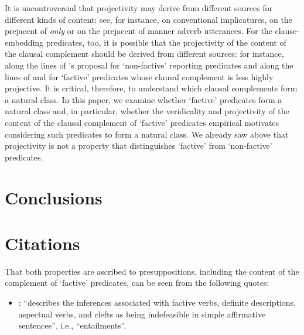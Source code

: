 \documentclass[11pt,fleqn]{article}
\newcommand{\6}{\mbox{$[\hspace*{-.6mm}[$}}
\newcommand{\9}{\mbox{$]\hspace*{-.6mm}]$}}
\newcommand{\citepos}[1]{\citeauthor{#1}'s \citeyear{#1}}
\begin{document}
{\begin{itemize}
It is uncontroversial that projectivity may derive from different sources for different kinds of content: see, for instance, \citealt{potts05} on conventional implicatures, \citealt{beaver-clark08} on the prejacent of {\em only} or \citealt{abrusan2013} on the prejacent of manner adverb utterances.  For the clause-embedding predicates, too, it is possible that the projectivity of the content of the clausal complement should be derived from different sources: for instance, along the lines of \citepos{anand-hacquard2014} proposal for `non-factive' reporting predicates and along the lines of \citealt{abusch10,abrusan2011} and \citealt{romoli2015} for `factive' predicates whose clausal complement is less highly projective. It is critical, therefore, to understand which clausal complements form a natural class. In this paper, we examine whether `factive' predicates form a natural class and, in particular, whether the veridicality and projectivity of the content of the clausal complement of `factive' predicates empirical motivates considering such predicates to form a natural class. We already saw above that projectivity is not a property that distinguishes `factive' from `non-factive' predicates. 

\end{itemize}

\section{Conclusions}\label{s5}

\appendix

\setcounter{table}{0}
\renewcommand{\thetable}{A\arabic{table}}

\setcounter{figure}{0}
\renewcommand{\thefigure}{A\arabic{figure}}

\section{Citations}

That both properties are ascribed to presuppositions, including the content of the complement of `factive' predicates, can be seen from the following quotes:

\begin{itemize}[topsep=0pt,itemsep=-3pt,leftmargin=12pt]

\item \citealt[66f.]{beaver01}: \citet[119-123]{gazdar79a} ``describes the inferences associated with factive verbs, definite descriptions, aspectual verbs, and clefts as being indefeasible in simple affirmative sentences'', i.e., ``entailments''.


\end{itemize}}
\end{document}
